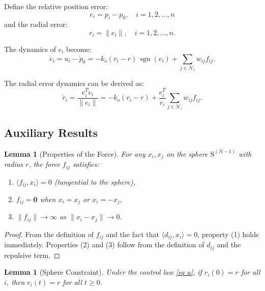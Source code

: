 \documentclass{ctexart}
\DeclareMathOperator{\sgn}{sgn}
\newtheorem{lemma}[theorem]{Lemma}
\begin{document}
Define the relative position error:
\begin{equation}
e_i = p_i - p_0, \quad i = 1,2,\dots,n
\end{equation}
and the radial error:
\begin{equation}
r_i = \|e_i\|, \quad i = 1,2,\dots,n.
\end{equation}

The dynamics of $e_i$ become:
\begin{equation}
\dot{e}_i = u_i - \dot{p}_0 = -k_o(r_i - r)\,\sgn(e_i) + \sum_{j \in \mathcal{N}_i} w_{ij} f_{ij}.
\label{eq: error_dynamics}
\end{equation}

The radial error dynamics can be derived as:
\begin{equation}
\dot{r}_i = \frac{e_i^T \dot{e}_i}{\|e_i\|} = -k_o(r_i - r) + \frac{e_i^T}{r_i} \sum_{j \in \mathcal{N}_i} w_{ij} f_{ij}.
\label{eq: radial_dynamics}
\end{equation}

\subsection*{Auxiliary Results}

\begin{lemma}[Properties of the Force]
For any $x_i, x_j$ on the sphere $\mathrm{S}^{(N-1)}$ with radius $r$, the force $f_{ij}$ satisfies:
\begin{enumerate}
    \item $\langle f_{ij}, x_i \rangle = 0$ (tangential to the sphere),
    \item $f_{ij} = \mathbf{0}$ when $x_i = x_j$ or $x_i = -x_j$,
    \item $\|f_{ij}\| \to \infty$ as $\|x_i - x_j\| \to 0$.
\end{enumerate}
\end{lemma}

\begin{proof}
From the definition of $f_{ij}$ and the fact that $\langle d_{ij}, x_i \rangle = 0$, property (1) holds immediately.
Properties (2) and (3) follow from the definition of $d_{ij}$ and the repulsive term.
\end{proof}

\begin{lemma}[Sphere Constraint]
Under the control law \eqref{eq u}, if $r_i(0) = r$ for all $i$, then $r_i(t) = r$ for all $t \geq 0$.
\end{lemma}
\end{document}
